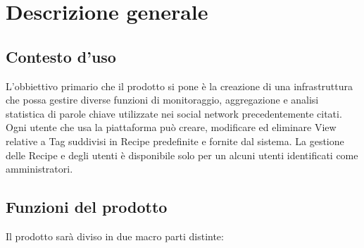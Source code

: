 %


\section{Descrizione generale}

\subsection{Contesto d'uso}
L'obbiettivo primario che il prodotto si pone è la creazione di una infrastruttura che
possa gestire diverse funzioni di monitoraggio, aggregazione e analisi statistica di parole chiave utilizzate nei social network precedentemente citati. Ogni utente che usa la piattaforma può creare, modificare ed eliminare View relative a Tag suddivisi in Recipe predefinite e fornite dal sistema.
La gestione delle Recipe e degli utenti è disponibile solo per un alcuni utenti identificati come amministratori.

\subsection{Funzioni del prodotto}
Il prodotto sarà diviso in due macro parti distinte:

